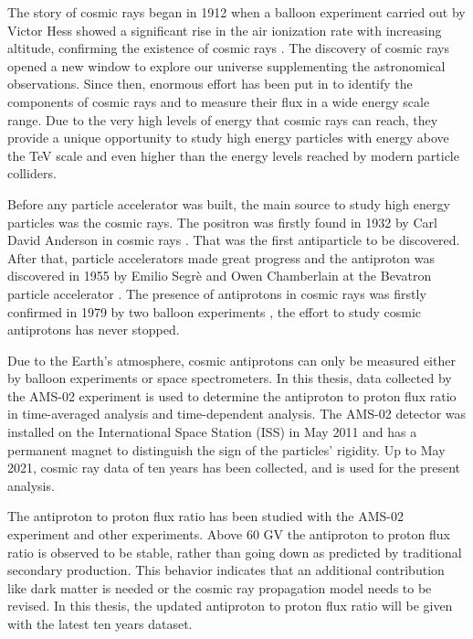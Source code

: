 

The story of cosmic rays began in 1912 when a balloon experiment carried out by Victor Hess showed a significant rise in the air ionization rate with increasing altitude, confirming the existence of cosmic rays \cite{NobelCosmicRay}. The discovery of cosmic rays opened a new window to explore our universe supplementing the astronomical observations. Since then, enormous effort has been put in to identify the components of cosmic rays and to measure their flux in a wide energy scale range. Due to the very high levels of energy that cosmic rays can reach, they provide a unique opportunity to study high energy particles with energy above the TeV scale and even higher than the energy levels reached by modern particle colliders.  \par   

Before any particle accelerator was built, the main source to study high energy particles was the cosmic rays. The positron was firstly found in 1932 by Carl David Anderson in cosmic rays \cite{PositronAndersonPaper}. That was the first antiparticle to be discovered. After that, particle accelerators made great progress and the antiproton was discovered in 1955 by Emilio Segrè and Owen Chamberlain at the Bevatron particle accelerator \cite{AntiprotonDiscoverPaper}. The presence of antiprotons in cosmic rays was firstly confirmed in 1979 by two balloon experiments \cite{CosmicAntiprotonBogomolov1979, CosmicAntiprotonGolden1979}, the effort to study cosmic antiprotons has never stopped. \par 

Due to the Earth’s atmosphere, cosmic antiprotons can only be measured either by balloon experiments or space spectrometers. In this thesis, data collected by the AMS-02 experiment is used to determine the antiproton to proton flux ratio in time-averaged analysis and time-dependent analysis. The AMS-02 detector was installed on the International Space Station (ISS) in May 2011 and has a permanent magnet to distinguish the sign of the particles’ rigidity. Up to May 2021, cosmic ray data of ten years has been collected, and is used for the present analysis. \par    

The antiproton to proton flux ratio has been studied with the AMS-02 experiment and other experiments. Above 60 GV the antiproton to proton flux ratio is observed to be stable, rather than going down as predicted by traditional secondary production. This behavior indicates that an additional contribution like dark matter is needed or the cosmic ray propagation model needs to be revised. In this thesis, the updated antiproton to proton flux ratio will be given with the latest ten years dataset. \par

